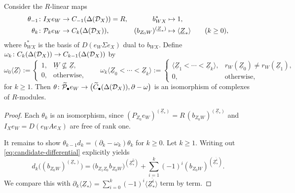 \documentclass[a4paper,leqno]{amsart}
\begin{document}
{\begin{lem}\label{lem:evaluated-differential}
Consider the $R$-linear maps
\begin{align*}
\theta_{-1}\colon &I_Xe_W\to C_{-1}(\Delta(\mathcal D_X))=R, & b_{WX}^* &\mapsto 1, \\
\theta_k\colon& \mathcal P_ke_W\to C_k(\Delta(\mathcal D_X)), & (b_{Z_0W})^{(\underline{Z}_\ast)}&\mapsto\langle\underline{Z}_\ast\rangle \qquad (k\ge 0),
\end{align*} 
where $b_{WX}^*$ is the basis of $D(e_W\Sigma e_X)$ dual to $b_{WX}$.
Define $\omega_k\colon C_k(\Delta(\mathcal D_X))\to C_{k-1}(\Delta(\mathcal D_X))$ by
\[
 \omega_0\langle\underline{Z}\rangle:=
 \begin{cases}
 1, & \underline{W}\not\subseteq\underline{Z},\\
 0, & \text{otherwise},
 \end{cases}
 \qquad
 \omega_k\langle\underline{Z}_0<\cdots<\underline{Z}_k\rangle:=
 \begin{cases}
 \langle\underline{Z}_1<\cdots<\underline{Z}_k\rangle, & r_W(\underline{Z}_0)\neq r_W(\underline{Z}_1),\\
 0, & \text{otherwise},
 \end{cases}
\]
for $k\geq1$. Then $\theta\colon\widetilde{\mathcal P}_\bullet e_W\to\bigl(\widetilde C_\bullet(\Delta(\mathcal D_X)),\partial-\omega\bigr)$ is an isomorphism of complexes of $R$-modules.
\end{lem}

\begin{proof}
Each $\theta_k$ is an isomorphism, since $(P_{Z_0}e_W)^{(\underline{Z}_\ast)}=R\,(b_{Z_0W})^{(\underline{Z}_\ast)}$ and $I_Xe_W=D(e_WAe_X)$ are free of rank one. 

It remains to show $\theta_{k-1}d_k=(\partial_k-\omega_k)\theta_k$ for $k\geq0$.
Let $k\geq1$. Writing out \eqref{eq:candidate-differential} explicitly yields
\begin{equation}
 d_k\bigl((b_{Z_0W})^{(\underline{Z}_\ast)}\bigr)
 =\bigl(b_{Z_1Z_0}b_{Z_0W}\bigr)^{(\underline{Z}_\ast^{\widehat{0}})}
 +\sum_{i=1}^k(-1)^i
 (b_{Z_0W})^{(\underline{Z}_\ast^{\widehat{i}})}.
 \label{eq:evaluated-differential}
\end{equation}
We compare this with $\partial_k\langle\underline{Z}_\ast\rangle=\sum_{i=0}^k(-1)^i\langle\underline{Z}_\ast^{\widehat{i}}\rangle$ term by term.


\end{proof}}
\end{document}
